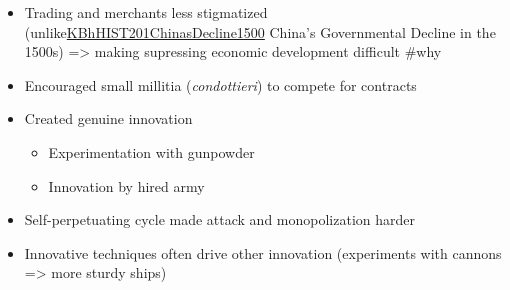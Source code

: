 \documentclass[letterpaper]{article}
\begin{document}
\begin{itemize}
\item Trading and merchants less stigmatized
(unlike\href{KBhHIST201ChinasDecline1500.org}{KBhHIST201ChinasDecline1500}
China's Governmental Decline in the 1500s) => making supressing
economic development difficult \#why
\item Encouraged small millitia (\emph{condottieri}) to compete for contracts
\item Created genuine innovation

\begin{itemize}
\item Experimentation with gunpowder
\item Innovation by hired army
\end{itemize}

\item Self-perpetuating cycle made attack and monopolization harder\\
\item Innovative techniques often drive other innovation (experiments with
cannons => more sturdy ships)
\end{itemize}
\end{document}
